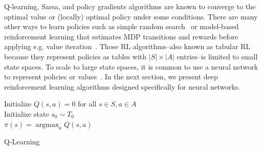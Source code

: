 Q-learning, Sarsa, and policy gradients algorithms are known to converge to the optimal value or (locally) optimal policy under some conditions.
There are many other ways to learn policies such as simple random search~\cite{random-search} or model-based reinforcement learning that estimates MDP transitions and rewards before applying e.g. value iteration~\cite{ucbvi}. 
Those RL algorithms--also known as tabular RL because they represent policies as tables with $|S|\times |A|$ entries--is limited to small state spaces.
To scale to large state spaces, it is common to use a neural network to represent policies or values~\cite{tdgammon}.
In the next section, we present deep reinforcement learning algorithms designed specifically for neural networks.
\begin{algorithm}
    Initialize $Q(s,a) = 0$ for all $s \in S, a \in A$ \\
    Initialize state $s_0 \sim T_0$ \\
    $\pi(s) = \operatorname{argmax}_a Q(s,a)$ 
    \caption{Q-Learning~\cite{watkins1992q}}\label{alg:qlearning}
\end{algorithm}


